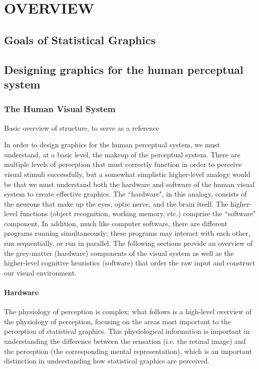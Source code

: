 \documentclass[11pt]{isuthesis}
\begin{document}
\graphicspath{{Figure/LitReview/}{Images/LitReview/}}
\renewcommand{\floatpagefraction}{.99}





\chapter{OVERVIEW}

\section{Goals of Statistical Graphics}

\section{Designing graphics for the human perceptual system}
\subsection{The Human Visual System}
Basic overview of structure, to serve as a reference

In order to design graphics for the human perceptual system, we must understand, at a basic level, the makeup of the perceptual system. There are multiple levels of perception that must correctly function in order to perceive visual stimuli successfully, but a somewhat simplistic higher-level analogy would be that we must understand both the hardware and software of the human visual system to create effective graphics.
The ``hardware", in this analogy, consists of the neurons that make up the eyes, optic nerve, and the brain itself. The higher-level functions (object recognition, working memory, etc.) comprise the ``software" component. In addition, much like computer software, there are different programs running simultaneously; these programs may interact with each other, run sequentially, or run in parallel. The following sections provide an overview of the grey-matter (hardware) components of the visual system as well as the higher-level cognitive heuristics (software) that order the raw input and construct our visual environment. 

\subsubsection{Hardware}
The physiology of perception is complex; what follows is a high-level overview of the physiology of perception, focusing on the areas most important to the perception of statistical graphics. This physiological information is important in understanding the difference between the sensation (i.e. the retinal image) and the perception (the corresponding mental representation), which is an important distinction in understanding how statistical graphics are perceived. 
\end{document}
